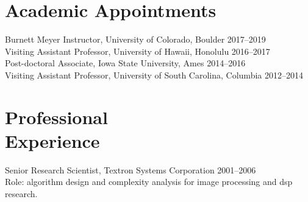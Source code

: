 \documentclass[margin,line]{resume}
\begin{document}
\begin{resume}
    \section{\mysidestyle Academic Appointments}
    Burnett Meyer Instructor, University of Colorado, Boulder \hfill  2017--2019 \\[3pt]
    Visiting Assistant Professor, University of Hawaii, Honolulu \hfill  2016--2017 \\[3pt]
    Post-doctoral Associate, Iowa State University, Ames \hfill  2014--2016 \\[3pt]
    Visiting Assistant Professor, University of South Carolina, Columbia \hfill  2012--2014


    \section{\mysidestyle Professional\\Experience}
    
    Senior Research Scientist, Textron Systems Corporation  \hfill 2001--2006\\
    Role: algorithm design and complexity analysis for image processing and dsp research.


    

\end{resume}
\end{document}

